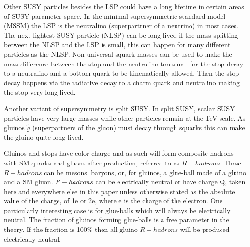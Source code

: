 Other SUSY particles besides the LSP could have a long lifetime in certain areas of SUSY parameter space. In the minimal supersymmetric standard model (MSSM) the LSP is the
neutralino (superpartrner of a neutrino) in most cases. The next lightest SUSY particle (NLSP) can be long-lived if the mass splitting between the NLSP and the LSP is small, this
can happen for many different particles as the NLSP. 
Non-universal squark masses can be used to make the mass difference between the stop and the neutralino too small for the stop decay to a neutralino and
a bottom quark to be kinematically allowed.
Then the stop decay happens via the radiative decay to a charm quark and neutralino making the stop very long-lived.

Another variant of supersymmetry is split SUSY. In split SUSY, scalar SUSY particles have very large masses while other particles remain at the TeV scale.
As gluinos $\tilde{g}$ (superpartners of the gluon) must decay through squarks this can make the gluino quite long-lived.

Gluinos and stops have color charge and as such will form composite hadrons with SM quarks and gluons after production, referred to as $R-hadrons$.
These $R-hadrons$ can be mesons, baryons, or, for gluinos, a glue-ball made of a gluino and a SM gluon.
$R-hadrons$ can be electrically neutral or have charge Q, taken here and everywhere else in this paper unless otherwise stated as the absolute value of the charge,
of 1e or 2e, where e is the charge of the electron.
One particularly interesting case is for glue-balls which will always be electrically neutral. The fraction of gluinos forming glue-balls is
a free parameter in the theory. If the fraction is 100\% then all gluino $R-hadrons$ will be produced electrically neutral.


